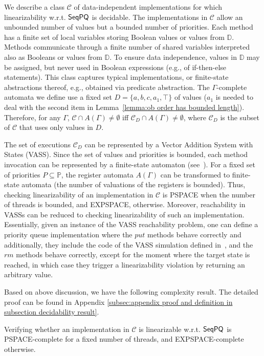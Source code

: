 We describe a class $\mathcal{C}$ of data-independent implementations for which linearizability w.r.t. $\mathsf{SeqPQ}$ is decidable. The implementations in $\mathcal{C}$ allow an unbounded number of values but a bounded number of priorities. Each method has a finite set of local variables storing Boolean values or values from $\mathbb{D}$. Methods communicate through a finite number of shared variables interpreted also as Booleans or values from $\mathbb{D}$. To ensure data independence, values in $\mathbb{D}$ may be assigned, but never used in Boolean expressions (e.g., of if-then-else statements). This class captures typical implementations, or finite-state abstractions thereof, e.g., obtained via predicate abstraction. The $\Gamma$-complete automata we define use a fixed set $D=\{a,b,c,a_1,\top\}$ of values ($a_1$ is needed to deal with the second item in Lemma~\ref{lemma:ob order has bounded length}). Therefore, for any $\Gamma$, $\mathcal{C}\cap A(\Gamma)\neq\emptyset$ iff $\mathcal{C}_D\cap A(\Gamma)\neq\emptyset$, where $\mathcal{C}_D$ is the subset of $\mathcal{C}$ that uses only values in $D$.

The set of executions $\mathcal{C}_D$ can be represented by a Vector Addition System with States (VASS). Since the set of values and priorities is bounded, each method invocation can be represented by a finite-state automaton (see~\cite{conf/esop/BouajjaniEEH13}). For a fixed set of priorities $P\subseteq \mathbb{P}$, the register automata $A(\Gamma)$ can be transformed to finite-state automata (the number of valuations of the registers is bounded). Thus, checking linearizability of an implementation in $\mathcal{C}$ is PSPACE when the number of threads is bounded, and EXPSPACE, otherwise. Moreover, reachability in VASSs can be reduced to checking linearizability of such an implementation. Essentially, given an instance of the VASS reachability problem, one can define a priority queue implementation where the $\textit{put}$ methods behave correctly and additionally, they include the code of the VASS simulation defined in~\cite{conf/esop/BouajjaniEEH13}, and the $\textit{rm}$ methods behave correctly, except for the moment where the target state is reached, in which case they trigger a linearizability violation by returning an arbitrary value. 

Based on above discussion, we have the following complexity result. The detailed proof can be found in Appendix \ref{subsec:appendix proof and definition in subsection decidability result}.




\begin{theorem}
\label{theorem:complexity of priority queue}
Verifying whether an implementation in $\mathcal{C}$ is linearizable w.r.t. $\mathsf{SeqPQ}$ is PSPACE-complete for a fixed number of threads, and EXPSPACE-complete otherwise.
\end{theorem}








